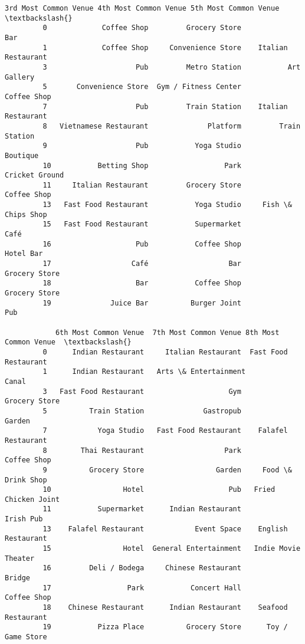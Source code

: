 \documentclass[11pt]{article}
\begin{document}
\begin{Verbatim}[commandchars=\\\{\}]
             3rd Most Common Venue 4th Most Common Venue 5th Most Common Venue  \textbackslash{}
         0             Coffee Shop         Grocery Store                   Bar   
         1             Coffee Shop     Convenience Store    Italian Restaurant   
         3                     Pub         Metro Station           Art Gallery   
         5       Convenience Store  Gym / Fitness Center           Coffee Shop   
         7                     Pub         Train Station    Italian Restaurant   
         8   Vietnamese Restaurant              Platform         Train Station   
         9                     Pub           Yoga Studio              Boutique   
         10           Betting Shop                  Park        Cricket Ground   
         11     Italian Restaurant         Grocery Store           Coffee Shop   
         13   Fast Food Restaurant           Yoga Studio     Fish \& Chips Shop   
         15   Fast Food Restaurant           Supermarket                  Café   
         16                    Pub           Coffee Shop             Hotel Bar   
         17                   Café                   Bar         Grocery Store   
         18                    Bar           Coffee Shop         Grocery Store   
         19              Juice Bar          Burger Joint                   Pub   
         
            6th Most Common Venue  7th Most Common Venue 8th Most Common Venue  \textbackslash{}
         0      Indian Restaurant     Italian Restaurant  Fast Food Restaurant   
         1      Indian Restaurant   Arts \& Entertainment                 Canal   
         3   Fast Food Restaurant                    Gym         Grocery Store   
         5          Train Station              Gastropub                Garden   
         7            Yoga Studio   Fast Food Restaurant    Falafel Restaurant   
         8        Thai Restaurant                   Park           Coffee Shop   
         9          Grocery Store                 Garden     Food \& Drink Shop   
         10                 Hotel                    Pub   Fried Chicken Joint   
         11           Supermarket      Indian Restaurant             Irish Pub   
         13    Falafel Restaurant            Event Space    English Restaurant   
         15                 Hotel  General Entertainment   Indie Movie Theater   
         16         Deli / Bodega     Chinese Restaurant                Bridge   
         17                  Park           Concert Hall           Coffee Shop   
         18    Chinese Restaurant      Indian Restaurant    Seafood Restaurant   
         19           Pizza Place          Grocery Store      Toy / Game Store   
         

\end{Verbatim}
\end{document}
